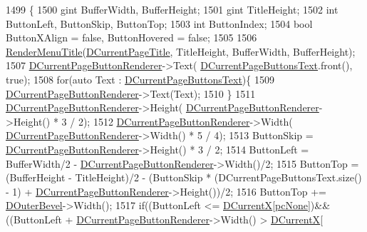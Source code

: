 \begin{DoxyCode}
1499                                            \{
1500     gint BufferWidth, BufferHeight;
1501     gint TitleHeight;
1502     \textcolor{keywordtype}{int} ButtonLeft, ButtonSkip, ButtonTop;
1503     \textcolor{keywordtype}{int} ButtonIndex;
1504     \textcolor{keywordtype}{bool} ButtonXAlign = \textcolor{keyword}{false}, ButtonHovered = \textcolor{keyword}{false};
1505 
1506     \hyperlink{classCApplicationData_a548c5924a281c7e226fd7cac44e59920}{RenderMenuTitle}(\hyperlink{classCApplicationData_a49ce7f0b5891f0f2c29b73aad636b761}{DCurrentPageTitle}, TitleHeight, BufferWidth, 
      BufferHeight); 
1507     \hyperlink{classCApplicationData_abfe1743f2634b069ccc811db4a8733a8}{DCurrentPageButtonRenderer}->Text(
      \hyperlink{classCApplicationData_af04b7f5f8ba4e5c99c0a3530055fc15d}{DCurrentPageButtonsText}.front(), \textcolor{keyword}{true});   
1508     \textcolor{keywordflow}{for}(\textcolor{keyword}{auto} Text : \hyperlink{classCApplicationData_af04b7f5f8ba4e5c99c0a3530055fc15d}{DCurrentPageButtonsText})\{
1509         \hyperlink{classCApplicationData_abfe1743f2634b069ccc811db4a8733a8}{DCurrentPageButtonRenderer}->Text(Text);
1510     \}
1511     \hyperlink{classCApplicationData_abfe1743f2634b069ccc811db4a8733a8}{DCurrentPageButtonRenderer}->Height(
      \hyperlink{classCApplicationData_abfe1743f2634b069ccc811db4a8733a8}{DCurrentPageButtonRenderer}->Height() * 3 / 2);
1512     \hyperlink{classCApplicationData_abfe1743f2634b069ccc811db4a8733a8}{DCurrentPageButtonRenderer}->Width(
      \hyperlink{classCApplicationData_abfe1743f2634b069ccc811db4a8733a8}{DCurrentPageButtonRenderer}->Width() * 5 / 4);
1513     ButtonSkip = \hyperlink{classCApplicationData_abfe1743f2634b069ccc811db4a8733a8}{DCurrentPageButtonRenderer}->Height() * 3 / 2;
1514     ButtonLeft = BufferWidth/2 - \hyperlink{classCApplicationData_abfe1743f2634b069ccc811db4a8733a8}{DCurrentPageButtonRenderer}->Width()/2;
1515     ButtonTop = (BufferHeight - TitleHeight)/2 - (ButtonSkip * (DCurrentPageButtonsText.size() - 1) + 
      \hyperlink{classCApplicationData_abfe1743f2634b069ccc811db4a8733a8}{DCurrentPageButtonRenderer}->Height())/2;
1516     ButtonTop += \hyperlink{classCApplicationData_abc2b04aa05148da81145ff6d6bc2bf01}{DOuterBevel}->Width();
1517     \textcolor{keywordflow}{if}((ButtonLeft <= \hyperlink{classCApplicationData_a1dc7ee482a39f7978c71365ac540f97a}{DCurrentX}[\hyperlink{GameDataTypes_8h_aafb0ca75933357ff28a6d7efbdd7602fa88767aa8e02c7b3192bbab4127b3d729}{pcNone}])&&((ButtonLeft + 
      \hyperlink{classCApplicationData_abfe1743f2634b069ccc811db4a8733a8}{DCurrentPageButtonRenderer}->Width() > \hyperlink{classCApplicationData_a1dc7ee482a39f7978c71365ac540f97a}{DCurrentX}[

\end{DoxyCode}
